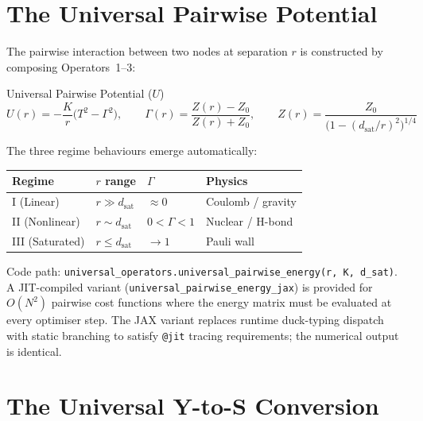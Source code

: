 \section{The Universal Pairwise Potential}
\label{sec:universal_pairwise}

The pairwise interaction between two nodes at separation $r$ is constructed
by composing Operators~1--3:

\begin{resultbox}{Universal Pairwise Potential ($U$)}
\begin{equation}
    U(r) = -\frac{K}{r}\bigl(T^2 - \Gamma^2\bigr), \qquad
    \Gamma(r) = \frac{Z(r) - Z_0}{Z(r) + Z_0}, \qquad
    Z(r) = \frac{Z_0}{\bigl(1 - (d_\text{sat}/r)^2\bigr)^{1/4}}
    \label{eq:universal_pairwise}
\end{equation}
\end{resultbox}

The three regime behaviours emerge automatically:
\begin{center}\small
\begin{tabularx}{\textwidth}{@{}l l l X@{}}
\toprule
\textbf{Regime} & \textbf{$r$ range} & \textbf{$\Gamma$}
  & \textbf{Physics} \\
\midrule
I (Linear) & $r \gg d_\text{sat}$ & $\approx 0$ & Coulomb / gravity \\
II (Nonlinear) & $r \sim d_\text{sat}$ & $0 < \Gamma < 1$ & Nuclear / H-bond \\
III (Saturated) & $r \leq d_\text{sat}$ & $\to 1$ & Pauli wall \\
\bottomrule
\end{tabularx}
\end{center}

Code path: \texttt{universal\_operators.universal\_pairwise\_energy(r, K, d\_sat)}.
A JIT-compiled variant (\texttt{universal\_pairwise\_energy\_jax}) is provided
for $O(N^2)$ pairwise cost functions where the energy matrix must be evaluated
at every optimiser step.  The JAX variant replaces runtime duck-typing dispatch
with static branching to satisfy \texttt{@jit} tracing requirements; the
numerical output is identical.

\section{The Universal Y-to-S Conversion}
\label{sec:universal_y_to_s}

